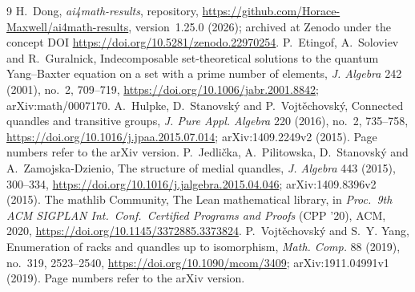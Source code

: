 \documentclass[11pt]{article}
\theoremstyle{definition}
\theoremstyle{remark}
\newcommand{\repoversion}{1.25.0}
\begin{document}
{\small
\begin{thebibliography}{9}
\setlength{\itemsep}{1pt}
 H.~Dong, \emph{ai4math-results}, repository,
\url{https://github.com/Horace-Maxwell/ai4math-results}, version~\repoversion{}
(2026); archived at Zenodo under the concept DOI
\url{https://doi.org/10.5281/zenodo.22970254}.
 P.~Etingof, A.~Soloviev and R.~Guralnick, Indecomposable
set-theoretical solutions to the quantum Yang--Baxter equation on a set with a
prime number of elements, \emph{J. Algebra} 242 (2001), no.~2, 709--719,
\url{https://doi.org/10.1006/jabr.2001.8842}; arXiv:math/0007170.
 A.~Hulpke, D.~Stanovsk\'y and P.~Vojt\v{e}chovsk\'y, Connected
quandles and transitive groups, \emph{J. Pure Appl. Algebra} 220 (2016),
no.~2, 735--758, \url{https://doi.org/10.1016/j.jpaa.2015.07.014};
arXiv:1409.2249v2 (2015). Page numbers refer to the arXiv version.
 P.~Jedli\v{c}ka, A.~Pilitowska, D.~Stanovsk\'y and
A.~Zamojska-Dzienio, The structure of medial quandles, \emph{J. Algebra} 443
(2015), 300--334, \url{https://doi.org/10.1016/j.jalgebra.2015.04.046};
arXiv:1409.8396v2 (2015).
The mathlib Community, The Lean mathematical library, in \emph{Proc.\ 9th ACM
SIGPLAN Int.\ Conf.\ Certified Programs and Proofs} (CPP '20), ACM, 2020,
\url{https://doi.org/10.1145/3372885.3373824}.
 P.~Vojt\v{e}chovsk\'y and S.~Y. Yang, Enumeration of racks and
quandles up to isomorphism, \emph{Math. Comp.} 88 (2019), no.~319,
2523--2540, \url{https://doi.org/10.1090/mcom/3409}; arXiv:1911.04991v1
(2019). Page numbers refer to the arXiv version.
\end{thebibliography}}
\end{document}

